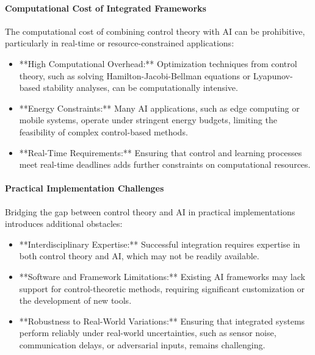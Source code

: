 \documentclass{IEEEojcsys}
\begin{document}
\paragraph{Computational Cost of Integrated Frameworks}
The computational cost of combining control theory with AI can be prohibitive, particularly in real-time or resource-constrained applications:
\begin{itemize}
    \item **High Computational Overhead:** Optimization techniques from control theory, such as solving Hamilton-Jacobi-Bellman equations or Lyapunov-based stability analyses, can be computationally intensive.
    \item **Energy Constraints:** Many AI applications, such as edge computing or mobile systems, operate under stringent energy budgets, limiting the feasibility of complex control-based methods.
    \item **Real-Time Requirements:** Ensuring that control and learning processes meet real-time deadlines adds further constraints on computational resources.
\end{itemize}

\paragraph{Practical Implementation Challenges}
Bridging the gap between control theory and AI in practical implementations introduces additional obstacles:
\begin{itemize}
    \item **Interdisciplinary Expertise:** Successful integration requires expertise in both control theory and AI, which may not be readily available.
    \item **Software and Framework Limitations:** Existing AI frameworks may lack support for control-theoretic methods, requiring significant customization or the development of new tools.
    \item **Robustness to Real-World Variations:** Ensuring that integrated systems perform reliably under real-world uncertainties, such as sensor noise, communication delays, or adversarial inputs, remains challenging.
\end{itemize}
\end{document}
